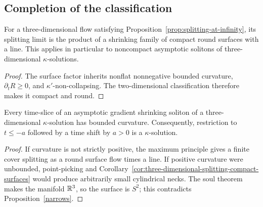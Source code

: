 \subsection{Completion of the classification}

\begin{corollary}\label{cor:three-dimensional-splitting-compact-surfaces}
\label{3Dinfty}

For a three-dimensional flow satisfying
Proposition~\ref{prop:splitting-at-infinity}, its splitting limit is
the product of a shrinking family of compact round surfaces with a
line. This applies in particular to noncompact asymptotic solitons
of three-dimensional $\kappa$-solutions.
\end{corollary}
\begin{proof}
\sketch
{}
The surface factor inherits nonflat nonnegative bounded curvature,
$\partial_tR\geq0$, and $\kappa'$-non-collapsing. The
two-dimensional classification therefore makes it compact and
round.
\end{proof}

\begin{corollary}\label{cor:three-dimensional-asymptotic-soliton-bounded-curvature}
\label{3DGSSkappa}

Every time-slice of an asymptotic gradient shrinking soliton of a
three-dimensional $\kappa$-solution has bounded curvature.
Consequently, restriction to $t\leq-a$ followed by a time shift by
$a>0$ is a $\kappa$-solution.
\end{corollary}
\begin{proof}
\sketch
{}
If curvature is not strictly positive, the maximum principle gives
a finite cover splitting as a round surface flow times a line. If
positive curvature were unbounded, point-picking and
Corollary~\ref{cor:three-dimensional-splitting-compact-surfaces}
would produce arbitrarily small cylindrical necks. The soul theorem
makes the manifold $\mathbb{R}^3$, so the surface is $S^2$; this
contradicts Proposition~\ref{narrows}.
\end{proof}

